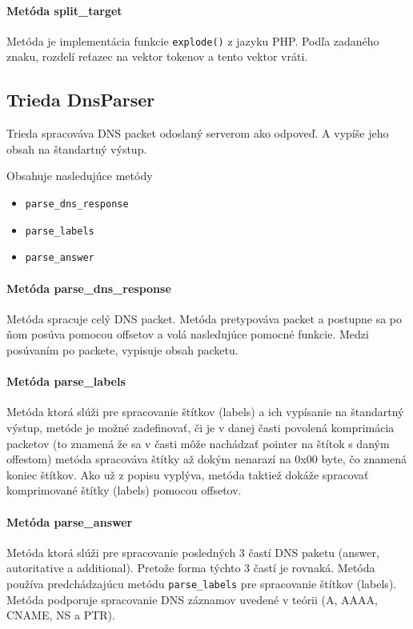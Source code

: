 \documentclass[titlepage]{article}
\begin{document}
\paragraph{Metóda split\_target}
Metóda je implementácia funkcie \verb|explode()| z jazyku PHP. Podľa zadaného znaku, rozdelí reťazec na vektor
tokenov a tento vektor vráti.

\subsection{Trieda DnsParser}
Trieda spracováva DNS packet odoslaný serverom ako odpoveď. A vypíše jeho obsah na štandartný výstup.

Obsahuje nasledujúce metódy
\begin{itemize}
   \item \verb|parse_dns_response|
   \item \verb|parse_labels|
   \item \verb|parse_answer| 
\end{itemize}

\paragraph{Metóda parse\_dns\_response}
Metóda spracuje celý DNS packet.
Metóda pretypováva packet a postupne sa po ňom posúva pomocou offsetov a volá nasledujúce pomocné funkcie.
Medzi posúvaním po packete, vypisuje obsah packetu.

\paragraph{Metóda parse\_labels}
Metóda ktorá slúži pre spracovanie štítkov (labels) a ich vypísanie na štandartný výstup, metóde je možné
zadefinovať, či je v danej časti povolená komprimácia packetov (to znamená že sa v časti môže nachádzať pointer na 
štítok s daným offestom) metóda spracováva štítky až dokým nenarazí na 0x00 byte, čo znamená koniec štítkov. Ako už z popisu 
vyplýva, metóda taktiež dokáže spracovať komprimované štítky (labels) pomocou offsetov.

\paragraph{Metóda parse\_answer}
Metóda ktorá slúži pre spracovanie posledných 3 častí DNS paketu (answer, autoritative a additional). Pretože 
forma týchto 3 častí je rovnaká. Metóda používa predchádzajúcu metódu \verb|parse_labels| pre spracovanie štítkov (labels).
Metóda podporuje spracovanie DNS záznamov uvedené v teórii (A, AAAA, CNAME, NS a PTR).
\end{document}
